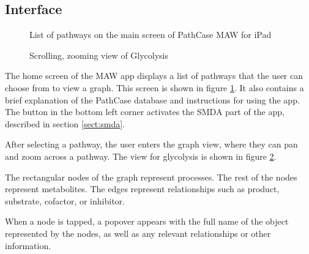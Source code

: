 \subsection{Interface}
\label{sect:maw_interface}

\begin{figure}[htb]
    \center{
        \texttt{[image: maw/figures/screenshot\_list]}}
    \caption{\label{fig:maw_screenshot_list} List of pathways on the main screen
    of PathCase MAW for iPad}
\end{figure}

\begin{figure}[hbt]
    \caption{\label{fig:maw_screenshot_pathway} Scrolling, zooming view of
    Glycolysis}
\end{figure}

The home screen of the MAW app displays a list of pathways that the user can
choose from to view a graph. This screen is shown in figure
\ref{fig:maw_screenshot_list}. It also contains a brief explanation of the
PathCase database and instructions for using the app. The button in the bottom
left corner activates the SMDA part of the app, described in section
\ref{sect:smda}.

After selecting a pathway, the user enters the graph view, where they can pan
and zoom across a pathway. The view for glycolysis is shown in figure
\ref{fig:maw_screenshot_pathway}.

The rectangular nodes of the graph represent processes. The rest of the nodes
represent metabolites. The edges represent relationships such as product,
substrate, cofactor, or inhibitor.

When a node is tapped, a popover appears with the full name of the object
represented by the nodes, as well as any relevant relationships or other
information.
